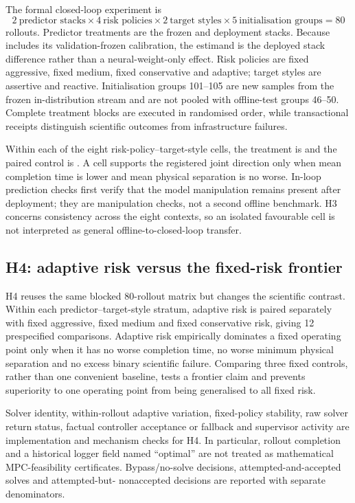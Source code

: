 The formal closed-loop experiment is
\[
2\ \text{predictor stacks}\times4\ \text{risk policies}\times
2\ \text{target styles}\times5\ \text{initialisation groups}=80
\]
rollouts. Predictor treatments are the frozen \Bzero{} and \Bone{} deployment
stacks. Because \Bone{} includes its validation-frozen calibration, the
estimand is the deployed stack difference rather than a neural-weight-only
effect. Risk policies are fixed aggressive, fixed medium, fixed conservative
and adaptive; target styles are assertive and reactive. Initialisation groups
101--105 are new samples from the frozen in-distribution stream and are not
pooled with offline-test groups 46--50. Complete treatment blocks are executed
in randomised order, while transactional receipts distinguish scientific
outcomes from infrastructure failures.

Within each of the eight risk-policy--target-style cells, the treatment is
\Bone{} and the paired control is \Bzero{}. A cell supports the registered
joint direction only when mean completion time is lower and mean physical
separation is no worse. In-loop prediction checks first verify that the model
manipulation remains present after deployment; they are manipulation checks,
not a second offline benchmark. H3 concerns consistency across the eight
contexts, so an isolated favourable cell is not interpreted as general
offline-to-closed-loop transfer.

\subsection{H4: adaptive risk versus the fixed-risk frontier}

H4 reuses the same blocked 80-rollout matrix but changes the scientific
contrast. Within each predictor--target-style stratum, adaptive risk is paired
separately with fixed aggressive, fixed medium and fixed conservative risk,
giving 12 prespecified comparisons. Adaptive risk empirically dominates a
fixed operating point only when it has no worse completion time, no worse
minimum physical separation and no excess binary scientific failure. Comparing
three fixed controls, rather than one convenient baseline, tests a frontier
claim and prevents superiority to one operating point from being generalised
to all fixed risk.

Solver identity, within-rollout adaptive variation, fixed-policy stability,
raw solver return status, factual controller acceptance or fallback and
supervisor activity are implementation and mechanism checks for H4. In
particular, rollout completion and a historical logger field named
``optimal'' are not treated as mathematical MPC-feasibility certificates.
Bypass/no-solve decisions, attempted-and-accepted solves and attempted-but-
nonaccepted decisions are reported with separate denominators.

